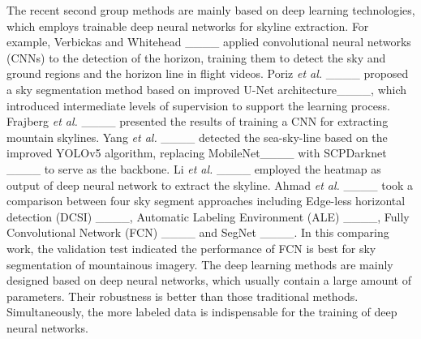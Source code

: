 \par The recent second group methods are mainly based on deep learning technologies, which employs trainable deep neural networks for skyline extraction. For example, Verbickas and Whitehead ____ applied convolutional neural networks (CNNs) to the detection of the horizon, training them to detect the sky and ground regions and the horizon line in flight videos. Poriz \textit{et al.} ____ proposed a sky segmentation method based on improved U-Net architecture____, which introduced intermediate levels of supervision to support the learning process. Frajberg \textit{et al.} ____  presented the results of training a CNN for extracting mountain skylines. Yang \textit{et al.} ____ detected the sea-sky-line based on the improved YOLOv5 algorithm, replacing MobileNet____ with SCPDarknet ____ to serve as the backbone. Li \textit{et al.} ____ employed the heatmap as output of deep neural network to extract the skyline. Ahmad \textit{et al.} ____ took a comparison between four sky segment approaches including Edge-less horizontal detection (DCSI) ____, Automatic Labeling Environment (ALE) ____, Fully Convolutional Network (FCN) ____ and SegNet ____. In this comparing work, the validation test indicated the performance of FCN is best for sky segmentation of mountainous imagery. The deep learning methods are mainly designed based on deep neural networks, which usually contain a large amount of parameters. Their robustness is better than those traditional methods. Simultaneously, the more labeled data is indispensable for the training of deep neural networks.